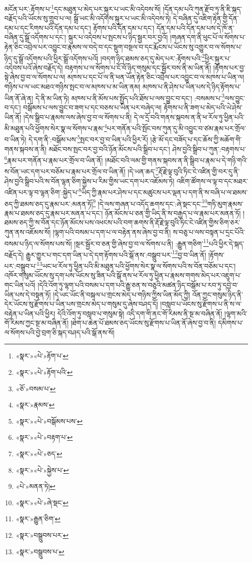 མངོན་པར་:རྟོགས་པ་\footnote{«སྣར་»«པེ་»རྟོག་པ་}དང་མཐུན་པ་མེད་པར་སྐུར་པ་ཡང་མི་འདེབས་སོ། །དོན་དམ་པའི་ཀུན་རྫོབ་ཏུ་ནི་ཇི་སྐད་བརྗོད་པའི་ཡོངས་སུ་གྲུབ་པ་ལ། སྒྲོ་ཡང་མི་འདོགས་སྐུར་པ་ཡང་མི་འདེབས་ཏེ། དེ་བཞིན་དུ་འཇིག་རྟེན་གྱི་དོན་དམ་པ་དང་རིགས་པའི་དོན་དམ་པ་དང་། རྟོགས་པའི་དོན་དམ་པ་དང་། དོན་དམ་པའི་དོན་དམ་པས་དེ་ཁོ་ན་བཞིན་དུ་སྒྲོ་འདོགས་པ་དང་། སྐུར་པ་འདེབས་པ་སྤངས་པ་ཉིད་སྦྱར་བར་བྱའོ། །གཞན་དག་ནི་ཕུང་པོ་ལ་སོགས་པ་རྟེན་ཅིང་འབྲེལ་པར་འབྱུང་བ་རྣམས་ལ་བདེ་བ་དང་སྡུག་བསྔལ་བ་དང་རྨོངས་པ་ཡོངས་སུ་འགྱུར་བ་ལ་སོགས་པ་ཉིད་དུ་སྒྲོ་འདོགས་པའི་ཕྱིར་སྒྲོ་འདོགས་པའོ། །བདག་ཉིད་ཐམས་ཅད་དུ་མེད་པར་:རྟོགས་པའི་\footnote{«སྣར་»«པེ་»རྟོག་པའི་}ཕྱིར་སྐུར་པ་འདེབས་པའོ་ཞེས་བརྗོད་དེ། བརྟགས་པ་ལ་སོགས་པ་ངོ་བོ་ཉིད་གསུམ་དང་སྦྱོར་བས་ནི་མ་ཡིན་ནོ། །རྟོགས་པར་བྱ་སྟེ་ཞེས་བྱ་བ་ལ་སོགས་པ་ལ། མཁས་པ་དང་པོ་ལ་ནི་ཕན་ཡོན་རྟེན་ཅིང་འབྲེལ་པར་འབྱུང་བ་ལ་མཁས་པ་ཡིན་ལ། གཉིས་པ་ལ་ཡང་མཐའ་གཉིས་སྤང་བ་ལ་མཁས་པ་མ་ཡིན་ནམ། མཁས་པ་ནི་ཤེས་པ་ཡིན་པས་དེ་ཉིད་རྟོགས་པ་ཡིན་ནོ་ཞེ་ན། དེ་ནི་མ་ཡིན་ཏེ། མཁས་པ་ནི་མོས་པས་སྤྱོད་པའི་ཐོས་པ་ལས་བྱུང་བ་དང་། :བསམས་པ་\footnote{«ཅོ་»བསམ་པ་}ལས་བྱུང་བ་དང་། བསྒོམས་པ་ལས་བྱུང་བ་ཟག་པ་དང་བཅས་པ་ཡིན་པར་བཞེད་ལ། རྟོགས་པ་ནི་ཟག་པ་མེད་པའི་ཡེ་ཤེས་ཡིན་ནོ། །དེས་སྒྲིབ་པ་རྣམས་ལས་ཞེས་བྱ་བ་ལ་སོགས་པ་ནི། དེ་ལ་དྲོ་བའི་གནས་སྐབས་ན་ནི་ཕ་རོལ་ཏུ་ཕྱིན་པའི་མི་མཐུན་པའི་ཕྱོགས་སེར་སྣ་ལ་སོགས་པ་རྣམ་\footnote{«སྣར་»རྣམས་}པར་གནོན་པའི་སྤོང་བས་ཀུན་དུ་མི་འབྱུང་བ་ཙམ་རྣམ་པར་གྲོལ་བ་ཡིན་ཏེ། དེ་དག་ནི་:བསྒོམ་པས་\footnote{«སྣར་»«པེ་»བསྒོམས་པས་}སྤང་བར་བྱ་བ་ཡིན་པའི་ཕྱིར་རོ། །རྩེ་མོ་དང་བཟོད་པ་དང་ཆོས་ཀྱི་མཆོག་གི་གནས་སྐབས་ན་ནི། མཐོང་བས་སྤང་བར་བྱ་བའི་ཉོན་མོངས་པའི་སྒྲིབ་པ་དང་། ཤེས་བྱའི་སྒྲིབ་པ་ཀུན་:བརྟགས་པ་\footnote{«སྣར་»«པེ་»བརྟག་པ་}རྣམ་པར་གནོན་པ་རྣམ་པར་གྲོལ་བ་ཡིན་ནོ། །མཐོང་བའི་ལམ་གྱི་གནས་སྐབས་ན་ནི་སྒྲིབ་པ་རྣམ་པ་དེ་གཉི་གའི་ས་བོན་ཡང་དག་པར་བཅོམ་པ་རྣམ་པར་གྲོལ་བ་ཡིན་ནོ། །དེ་ཡན་ཆད་\footnote{«སྣར་»«པེ་»ཅད་}རྡོ་རྗེ་ལྟ་བུའི་ཏིང་ངེ་འཛིན་གྱི་བར་དུ་ནི་ཤེས་བྱའི་སྒྲིབ་པའི་ས་བོན་ལྷན་ཅིག་སྐྱེས་པ་རིམ་གྱིས་ཡང་དག་པར་འཇོམས་ཏེ། འཇིག་ཚོགས་ལ་ལྟ་བ་དང་མཐར་འཛིན་པར་ལྟ་བ་ལྷན་ཅིག་:སྐྱེད་པ་\footnote{«སྣར་»«པེ་»སྐྱེས་པ་}ཡིད་ཀྱི་རྣམ་པར་ཤེས་པ་དང་མཚུངས་པར་ལྡན་པ་དག་ནི་ས་བཞི་པ་ལ་ཐམས་ཅད་ཀྱི་ཐམས་ཅད་དུ་རྣམ་པར་:མནན་ཏོ།\footnote{«པེ་»མནན་ཏེ།} །དེ་ལས་གཞན་པ་འདོད་ཆགས་དང་:ཞེ་སྡང་དང་\footnote{«སྣར་»«པེ་»ཞེ་སྡང་}གཏི་མུག་རྣམས་རྣམ་པ་ཐམས་ཅད་དུ་རྣམ་པར་མནན་པ་དང་། ཉོན་མོངས་པ་ཅན་གྱི་ཡིད་ནི་ས་བརྒྱད་པ་ལ་རྣམ་པར་མནན་ཏོ། །ཐམས་ཅད་ཀྱི་ས་བོན་དང་ཉོན་མོངས་པས་འཕངས་པའི་བག་ཆགས་ནི་རྡོ་རྗེ་ལྟ་བུའི་ཏིང་ངེ་འཛིན་གྱིས་ཅིག་ཅར་ཀུན་ནས་འཇོམས་སོ། །ལྷག་པའི་བསམ་པ་དག་པ་ལ་བརྟེན་ནས་ཞེས་བྱ་བ་ནི། ས་བཅུ་པ་ལས་བསྟན་པ་དྲང་པོའི་བསམ་པ་ཉིད་ལ་སོགས་པས་སོ། །སྔར་སྦྱོར་བ་ཅན་གྱི་ཞེས་བྱ་བ་ལ་སོགས་པ་ནི། :རྒྱུན་གཅིག་\footnote{«སྣར་»རྒྱུན་ཅིག་}པའི་ཕྱིར་དེ་སྐད་བརྗོད་དེ། རྒྱུར་གྱུར་པ་གང་དག་ཡིན་པ་དེ་དག་རྟོགས་པའི་སྒོ་ནས་:བསྒྲུབ་པར་\footnote{«སྣར་»བསྒྲུབས་པར་}བྱ་བ་ཡིན་ནོ། །རྟོགས་པར་:བསྒྲུབ་པ་\footnote{«སྣར་»བསྒྲུབས་པ་}ཡང་ཕ་རོལ་ཏུ་ཕྱིན་པའི་མི་མཐུན་པའི་ཕྱོགས་སེར་སྣ་ལ་སོགས་པའི་ས་བོན་བཅོམ་པ་དང་། འཁོར་གསུམ་ཡོངས་སུ་དག་པས་ཡོངས་སུ་ཟིན་པའི་སྒོ་ནས་ཕ་རོལ་ཏུ་ཕྱིན་པ་རྣམས་གགས་མེད་པར་འཇུག་པ་གང་ཡིན་པའོ། །དེའི་འོག་ཏུ་ལྷག་པའི་བསམ་པ་དག་པའི་རྒྱུ་ཅན་ས་བཅུའི་མཚན་ཉིད་བསྒོམ་པ་རབ་ཏུ་དབྱེ་བ་ཡིན་པས་དེ་བསྟན་ཏོ། །དེ་ཡང་ཡོང་ནི་བསྐལ་པ་གྲངས་མེད་པ་གཉིས་ཀྱིས་ཡིན་མོད་ཀྱི། འོན་ཀྱང་གསུམ་ཉིད་ནི་དེར་ཡོངས་སུ་རྫོགས་པ་ཡིན་པས་གྲངས་མེད་པ་གསུམ་དུ་ཞེས་བཤད་དོ། །བསླབ་པ་ཡོངས་སུ་རྫོགས་པ་ནི་ས་ལ་བརྟེན་པ་ཡིན་པའི་ཕྱིར། དེའི་འོག་ཏུ་བསླབ་པ་གསུམ་སྟེ། འདི་དག་གི་ནང་གོ་རིམས་ནི་སྔ་མ་བཞིན་ནོ། །ལྷག་མའི་གོ་རིམས་ཀྱང་སྔ་མ་བཞིན་ནོ། །ཐེག་པ་ཆེན་པོ་ཐམས་ཅད་ཡོངས་སུ་རྫོགས་པ་ཡིན་ནོ་ཞེས་བྱ་བ་ནི། དམིགས་པ་ལ་སོགས་པའི་བྱེ་བྲག་ཅི་སྐད་བཤད་པའི་སྒོ་ནས་སོ། 